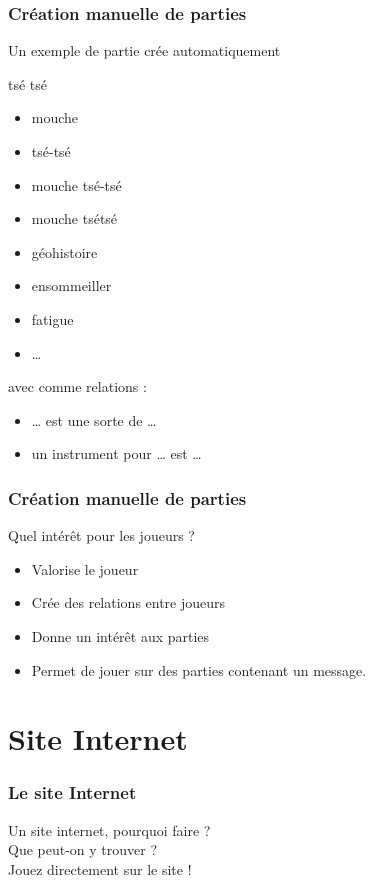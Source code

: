 \documentclass{beamer}
\begin{document}
\begin{frame}
  \frametitle{Création manuelle de parties}
  \begin{block}{Un exemple de partie crée automatiquement}
    \begin{center}
		tsé tsé
    \end{center}
	  \begin{multicols}{2}
		\begin{itemize}
		  \item mouche
		  \item tsé-tsé
		  \item mouche tsé-tsé
		  \item mouche tsétsé
		  \item géohistoire
		  \item ensommeiller
		  \item fatigue
		  \item \dots{}
	    \end{itemize}
	  \end{multicols}
	  avec comme relations :
	  \begin{itemize}
	  	\item \dots{} est une sorte de \dots{}
		\item un instrument pour \dots{} est \dots{}
	  \end{itemize}
	\end{block}
\end{frame}

\begin{frame}
  \frametitle{Création manuelle de parties}
  \begin{block}{Quel intérêt pour les joueurs ?}

  \begin{itemize}
    \item Valorise le joueur
    \item Crée des relations entre joueurs
    \item Donne un intérêt aux parties
    \item Permet de jouer sur des parties contenant un message.
  \end{itemize}
  \end{block}
\end{frame}

\section{Site Internet}
\begin{frame}
  \frametitle{Le site Internet}
  \begin{block}{}
  \large Un site internet, pourquoi faire ?
  \newline \\
  \large Que peut-on y trouver ?
  \newline \\
  \large Jouez directement sur le site !
  \end{block}
\end{frame}
\end{document}
